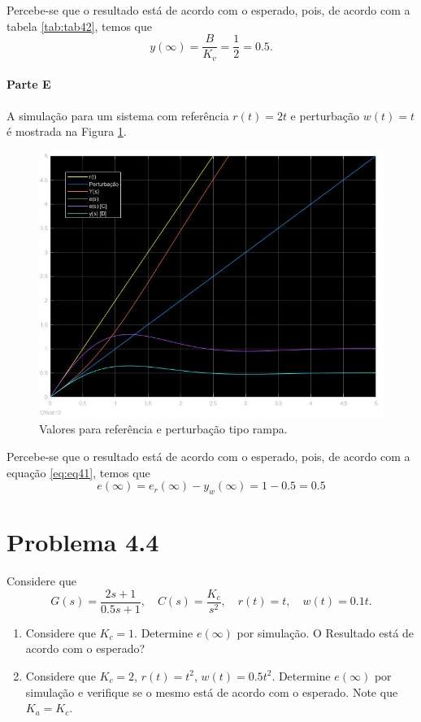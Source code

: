 \documentclass[
]{book}
\providecommand{\tightlist}{%
  \setlength{\itemsep}{0pt}\setlength{\parskip}{0pt}}
\theoremstyle{definition}
\theoremstyle{definition}
\theoremstyle{definition}
\theoremstyle{remark}
\begin{document}
Percebe-se que o resultado está de acordo com o esperado, pois, de acordo com a tabela \ref{tab:tab42}, temos que
\[
y(\infty) = \frac {B}{K_v} = \frac {1}{2} = 0.5.
\]

\hypertarget{parte-e}{%
\paragraph{Parte E}\label{parte-e}}

A simulação para um sistema com referência \(r(t) = 2t\) e perturbação \(w(t) = t\) é mostrada na Figura \ref{fig:fig43E1}.

\begin{figure}
\includegraphics[width=0.8\linewidth]{Imagens/Lab4/Resolução/prob3E1} \caption{Valores para referência e perturbação tipo rampa.}\label{fig:fig43E1}
\end{figure}

Percebe-se que o resultado está de acordo com o esperado, pois, de acordo com a equação \eqref{eq:eq41}, temos que
\[
e(\infty) = e_r(\infty) - y_w(\infty) = 1 - 0.5 = 0.5
\]

\hypertarget{problema-4.4}{%
\section*{Problema 4.4}\label{problema-4.4}}

Considere que
\[
G(s) = \frac {2s +1}{0.5s+1}, \quad C(s) = \frac {K_c}{s^2}, \quad r(t) = t, \quad w(t) = 0.1t.
\]

\begin{enumerate}
\def\labelenumi{\alph{enumi}.}
\tightlist
\item
  Considere que \(K_c =1\). Determine \(e(\infty)\) por simulação. O Resultado está de acordo com o esperado?
\item
  Considere que \(K_c =2\), \(r(t) = t^2\), \(w(t) = 0.5t^2\). Determine \(e(\infty)\) por simulação e verifique se o mesmo está de acordo com o esperado. Note que \(K_a = K_c\).
\end{enumerate}
\end{document}
